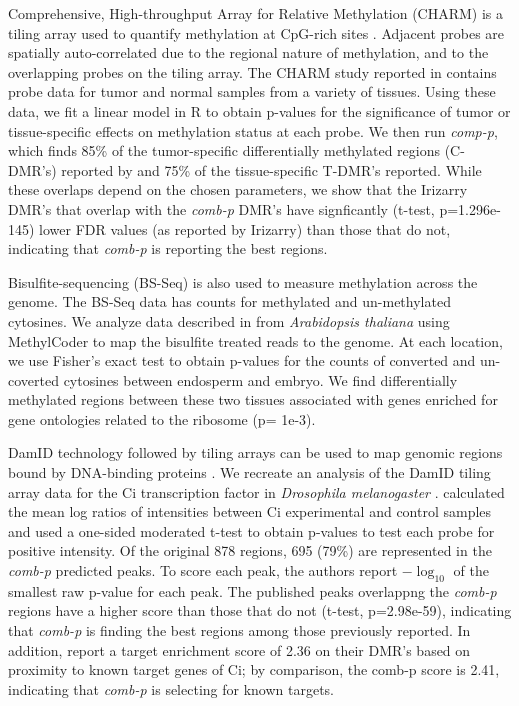 \documentclass{bioinfo}
\begin{document}
\begin{methods}
Comprehensive, High-throughput Array for Relative Methylation (CHARM)
is a tiling array used to quantify methylation at CpG-rich sites
\citep{Irizarry2008}.  Adjacent probes are spatially auto-correlated
due to the regional nature of methylation, and to the overlapping
probes on the tiling array.  The CHARM study reported in
\cite{Irizarry2009} contains probe data for tumor and normal samples
from a variety of tissues. Using these data, we fit a linear model in R
\citep{R} to
obtain p-values for the significance of tumor or tissue-specific
effects on methylation status at each probe.  We then run
\textit{comp-p}, which finds 85\% of the tumor-specific differentially
methylated regions (C-DMR's) reported by \cite{Irizarry2009} and 75\% of
the tissue-specific T-DMR's reported.  While these overlaps depend on
the chosen parameters, we show that the Irizarry DMR's that overlap
with the \textit{comb-p} DMR's have signficantly (t-test,
p=1.296e-145) lower FDR values (as reported by Irizarry) than those
that do not, indicating that \textit{comb-p} is reporting the best regions.

Bisulfite-sequencing (BS-Seq) is also used to measure methylation across the
genome. The BS-Seq data
has counts for methylated and un-methylated cytosines.  We
analyze data described in \cite{Hsieh2009} from {\it Arabidopsis
thaliana} using MethylCoder \citep{Pedersen2011} to map the
bisulfite treated reads to the genome. At each location,
we use Fisher's exact test to obtain p-values for the counts of
converted and un-coverted cytosines between endosperm and embryo. We find
differentially methylated regions between these two tissues associated
with genes enriched for gene ontologies related to the ribosome (p=
1e-3).

DamID technology followed by tiling arrays can be used to map genomic
regions bound by DNA-binding proteins \citep{Steensel2001}.  We
recreate an analysis of the DamID tiling array data for the Ci
transcription factor in {\it Drosophila melanogaster} \citep{Biehs}.
\cite{Kechris2010} calculated the
mean log ratios of intensities between Ci experimental and control
samples and used a one-sided moderated t-test \citep{Limma2005} to obtain
p-values to test each probe for positive intensity.
Of the original 878 regions, 695 (79\%) are
represented in the \textit{comb-p} predicted peaks.  To score each
peak, the authors report $-\log_{10}$ of the smallest raw p-value for
each peak. The published peaks overlappng the \textit{comb-p} regions
have a higher score than those that do not (t-test, p=2.98e-59),
indicating that \textit{comb-p}
is finding the best regions among those previously reported.
In addition,
\cite{Kechris2010} report a target enrichment score of 2.36 on their DMR's
based on proximity to known target genes of Ci; by comparison, the
comb-p score is 2.41, indicating that \textit{comb-p} is
selecting for known targets.

\end{methods}
\end{document}

